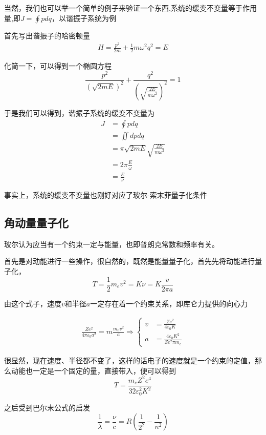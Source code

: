 \documentclass{article}
\begin{document}
当然，我们也可以举一个简单的例子来验证一个东西,系统的缓变不变量等于作用量,即$\displaystyle J=\oint pdq$，以谐振子系统为例

首先写出谐振子的哈密顿量
\begin{align*}
	H = \frac{p^2}{2m}+\frac{1}{2}m\omega^2q^2=E
\end{align*}

化简一下，可以得到一个椭圆方程
\[\frac{p^2}{(\sqrt{2mE})^2}+\frac{q^2}{(\sqrt{\frac{2E}{m\omega^2}})^2}=1\]

于是我们可以得到，谐振子系统的缓变不变量为
\begin{align*}
	J & =\oint pdq                                  \\
	  & =\iint dpdq                                 \\
	  & =\pi \sqrt{2mE} \sqrt{\frac{2E}{m\omega^2}} \\
	  & =2\pi\frac{E}{\omega}                       \\
	  & =\frac{E}{\nu}
\end{align*}

事实上，系统的缓变不变量也刚好对应了玻尔-索末菲量子化条件


\subsection{角动量量子化}
玻尔认为应当有一个约束一定与能量，也即普朗克常数和频率有关。

首先是对动能进行一些操作，很自然的，既然是能量量子化，首先先将动能进行量子化，
\[T = \frac{1}{2}m_ev^2=K\nu=K\frac{v}{2\pi a}\]

由这个式子，速度$v$和半径$a$一定存在着一个约束关系，即库仑力提供的向心力

\begin{align*}
	\frac{Ze^2}{4\pi\varepsilon_0a^2}=m\frac{m_ev^2}{a}
	\Rightarrow
	\begin{cases}
		v & = \frac{Ze^2}{4\varepsilon_0K}          \\
		a & = \frac{4\varepsilon_0K^2}{Ze^2\pi m_e}
	\end{cases}
\end{align*}

很显然，现在速度、半径都不变了，这样的话电子的速度就是一个约束的定值，那么动能也一定是一个固定的量，直接带入，便可以得到
\begin{equation*}
	T = \frac{m_eZ^2e^4}{32\varepsilon_0^2K^2}
\end{equation*}

之后受到巴尔末公式的启发
\begin{equation*}
	\frac{1}{\lambda}=\frac{\nu}{c}=R\left(\frac{1}{2^2}-\frac{1}{n^2}\right)
\end{equation*}
\end{document}
